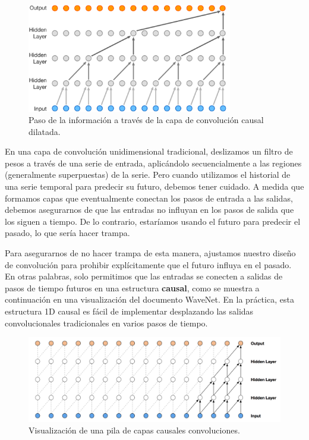 \documentclass[a4paper,12pt]{article}
\begin{document}
\begin{figure}[H]
	\begin{center}				
		\includegraphics[width=0.8\textwidth]{causal-conv.png}
		\caption{Paso de la información a través de la capa de convolución causal dilatada. \citep{wavenet2}}
		\label{fig:causal-conv}
	\end{center}
\end{figure}

En una capa de convolución unidimensional tradicional, deslizamos un filtro de pesos a través de una serie de entrada, aplicándolo secuencialmente a las regiones (generalmente superpuestas) de la serie. Pero cuando utilizamos el historial de una serie temporal para predecir su futuro, debemos tener cuidado. A medida que formamos capas que eventualmente conectan los pasos de entrada a las salidas, debemos asegurarnos de que las entradas no influyan en los pasos de salida que los siguen a tiempo. De lo contrario, estaríamos usando el futuro para predecir el pasado, lo que sería hacer trampa.

Para asegurarnos de no hacer trampa de esta manera, ajustamos nuestro diseño de convolución para prohibir explícitamente que el futuro influya en el pasado. En otras palabras, solo permitimos que las entradas se conecten a salidas de pasos de tiempo futuros en una estructura \textbf{causal}, como se muestra a continuación en una visualización del documento WaveNet. En la práctica, esta estructura 1D causal es fácil de implementar desplazando las salidas convolucionales tradicionales en varios pasos de tiempo.

\begin{figure}[H]
	\begin{center}				
		\includegraphics[width=1\textwidth]{stackcausal-conv.png}
		\caption{Visualización de una pila de capas causales convoluciones. \citep{wavenet2}}
		\label{fig:stackcausal-conv}
	\end{center}
\end{figure}
\end{document}
